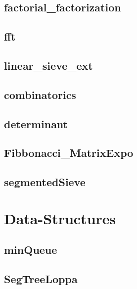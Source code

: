 \subsection{factorial_factorization}
\raggedbottom
\hrulefill
\subsection{fft}
\raggedbottom
\hrulefill
\subsection{linear_sieve_ext}
\raggedbottom
\hrulefill
\subsection{combinatorics}
\raggedbottom
\hrulefill
\subsection{determinant}
\raggedbottom
\hrulefill
\subsection{Fibbonacci_MatrixExpo}
\raggedbottom
\hrulefill
\subsection{segmentedSieve}
\raggedbottom
\hrulefill

\section{Data-Structures}
\subsection{minQueue}
\raggedbottom
\hrulefill
\subsection{SegTreeLoppa}
\raggedbottom
\hrulefill
